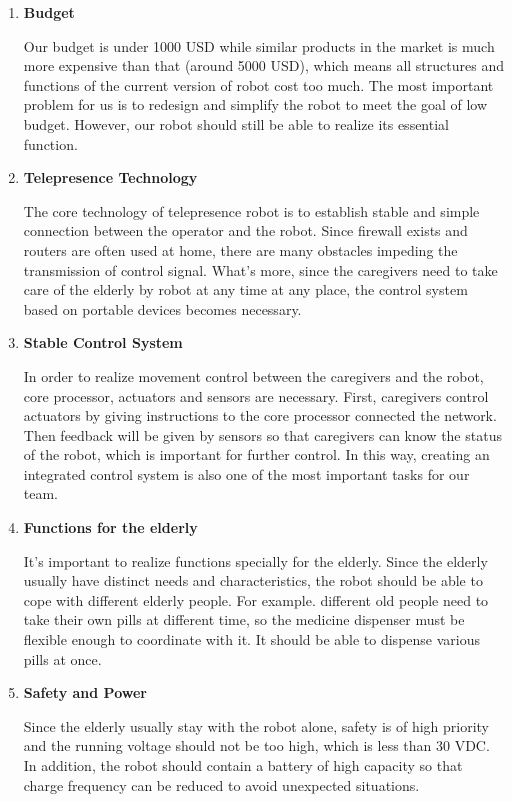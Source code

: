 \documentclass[12pt]{article}
\begin{document}
\begin{enumerate}[1]
\item \textbf{Budget}
\par Our budget is under 1000 USD while similar products in the market is much more expensive than that (around 5000 USD), which means all structures and functions of the current version of robot cost too much. The most important problem for us is to redesign and simplify the robot to meet the goal of low budget. However, our robot should still be able to realize its essential function.
\item \textbf{Telepresence Technology}
\par The core technology of telepresence robot is to establish stable and simple connection between the operator and the robot. Since firewall exists and routers are often used at home, there are many obstacles impeding the transmission of control signal. What's more, since the caregivers need to take care of the elderly by robot at any time at any place, the control system based on portable devices becomes necessary.
\item \textbf{Stable Control System} 
\par In order to realize movement control between the caregivers and the robot, core processor, actuators and sensors are necessary. First, caregivers control actuators by giving instructions to the core processor connected the network. Then feedback will be given by sensors so that caregivers can know the status of the robot, which is important for further control. In this way, creating an integrated control system is also one of the most important tasks for our team.
\item \textbf{Functions for the elderly}
\par It's important to realize functions specially for the elderly. Since the elderly usually have distinct needs and  characteristics, the robot should be able to cope with different elderly people. For example. different old people need to take their own pills at different time, so the medicine dispenser must be flexible enough to coordinate with it. It should be able to dispense various pills at once.
\item \textbf{Safety and Power}
\par Since the elderly usually stay with the robot alone, safety is of high priority and the running voltage should not be too high, which is less than 30 VDC. In addition, the robot should contain a battery of high capacity so that charge frequency can be reduced to avoid unexpected situations.
\end{enumerate}
\end{document}
